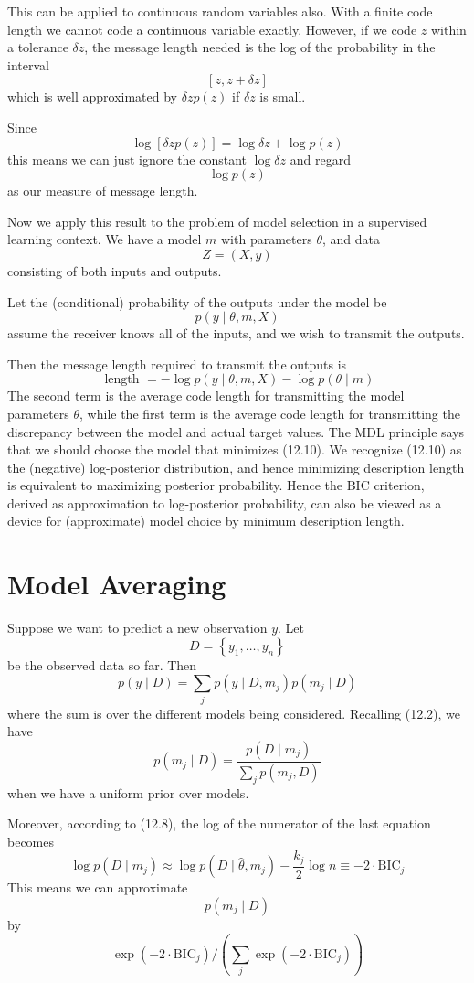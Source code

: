 \documentclass[11pt]{article}
\theoremstyle{plain} %
\theoremstyle{remark}
\begin{document}
This can be applied to continuous random variables also. With a finite code length we cannot code a continuous variable exactly. However, if we code $z$ within a tolerance $\delta z$, the message
length needed is the log of the probability in the interval
$$
  [z, z+\delta z]
$$
which is well approximated by $\delta z p(z)$ if $\delta z$ is small.

Since
$$
  \log [\delta z p(z)]=\log \delta z+\log p(z)
$$
this means we can just ignore the constant $\log \delta z$ and regard
$$
  \log p(z)
$$
as our measure of message length.

Now we apply this result to the problem of model selection in a
supervised learning context. We have a model $m$ with parameters $\theta$, and data
$$
  Z=(X, y)
$$
consisting of both inputs and outputs.

Let the (conditional) probability of the outputs under the model be
$$
  p(y \mid \theta, m, X)
$$
assume the receiver knows all of the inputs, and we wish to transmit the
outputs.

Then the message length required to transmit the outputs is
$$
  \text { length }=-\log p(y \mid \theta, m, X)-\log p(\theta \mid m)
$$
The second term is the average code length for transmitting the model
parameters $\theta$, while the first term is the average code length for
transmitting the discrepancy between the model and actual target values. The MDL principle says that we should choose the model that minimizes
(12.10). We recognize (12.10) as the (negative) log-posterior distribution, and
hence minimizing description length is equivalent to maximizing posterior
probability. Hence the BIC criterion, derived as approximation to log-posterior
probability, can also be viewed as a device for (approximate) model choice by
minimum description length.

\section{Model Averaging}
Suppose we want to predict a new observation $y$. Let
$$
  D=\left\{y_{1}, \ldots, y_{n}\right\}
$$
be the observed data so far. Then
$$
  p(y \mid D)=\sum_{j} p\left(y \mid D, m_{j}\right) p\left(m_{j} \mid D\right)
$$
where the sum is over the different models being considered. Recalling (12.2), we have
$$
  p\left(m_{j} \mid D\right)=\frac{p\left(D \mid m_{j}\right)}{\sum_{j} p\left(m_{j}, D\right)}
$$
when we have a uniform prior over models.

Moreover, according to (12.8), the log of the numerator of the last
equation becomes
$$
  \log p\left(D \mid m_{j}\right) \approx \log p\left(D \mid \hat{\theta}, m_{j}\right)-\frac{k_{j}}{2} \log n \equiv-2 \cdot \mathrm{BIC}_{j}
$$
This means we can approximate
$$
  p\left(m_{j} \mid D\right)
$$
by
$$
  \exp \left(-2 \cdot \mathrm{BIC}_{j}\right) /\left(\sum_{j} \exp \left(-2 \cdot \mathrm{BIC}_{j}\right)\right)
$$
\end{document}

